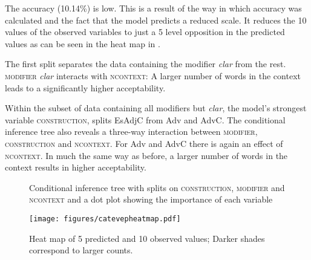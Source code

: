 The accuracy (10.14\%) is  low. This is  a result of  the way in which accuracy was calculated and the fact that the model predicts a reduced scale. It reduces the 10 values of the observed variables to just a 5 level opposition in the predicted values as can be seen in the heat map in . 

The first split separates the data containing the modifier \emph{clar} from the rest. \textsc{modifier} \emph{clar} interacts with \textsc{ncontext}: A larger number of words in the context leads to a significantly higher acceptability. 

\begin{sloppypar}
Within the subset of data containing all modifiers but \emph{clar}, the model's strongest variable \textsc{construction},  splits EsAdjC from Adv and AdvC.  The conditional inference tree also reveals a three-way interaction  between \textsc{modifier}, \textsc{construction} and \textsc{ncontext}. For Adv and AdvC there is again an effect of \textsc{ncontext}. In much the same way as before, a larger number of words in the context results in higher acceptability.
\end{sloppypar}

\begin{figure}
	\caption{Conditional inference tree with splits on \textsc{construction}, \textsc{modifier} and \textsc{ncontext} and a  dot plot showing the importance of each variable \label{fig:catevepctree}}
\end{figure}



\begin{figure}
	\texttt{[image: figures/catevepheatmap.pdf]}
	\caption{Heat map of 5 predicted and 10 observed values; Darker  shades  correspond to
		larger counts.\label{fig:catepevheatmap}}
\end{figure}

